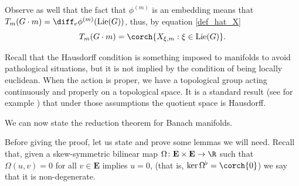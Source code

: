 Observe as well that the fact that \(\phi^{(m)}\) is an embedding means that \(T_{m}(G \cdot m)=\diff_e\phi^{(m)}(\mathrm{Lie}(G))\), thus, by equation \eqref{def_hat_X}
\begin{equation} \label{eq_tang_orbit}
T_m(G \cdot m)=\corch{X_{\xi, m}: \xi \in \mathrm{Lie}(G)}.
\end{equation}

\begin{obs}
    Recall that the Hausdorff condition is something imposed to manifolds to avoid pathological situations, but it is not implied by the condition of being locally euclidean. When the action is proper, we have a topological group acting continuously and properly on a topological space. It is a standard result (see for example \parencite[Prop. 21.4]{lee_introSM}) that under those assumptions the quotient space is Hausdorff.
\end{obs}

We can now state the reduction theorem for Banach manifolds.


Before giving the proof, let us state and prove some lemmas we will need. Recall that, given a skew-symmetric bilinear map \(\Omega\colon \mathbf{E} \times \mathbf{E} \to \R\) such that \(\Omega(u,v)=0\) for all \(v \in \mathbf{E}\) implies \(u=0\), (that is, \(\ker \Omega^\flat=\corch{0}\)) we say that it is non-degenerate. 

